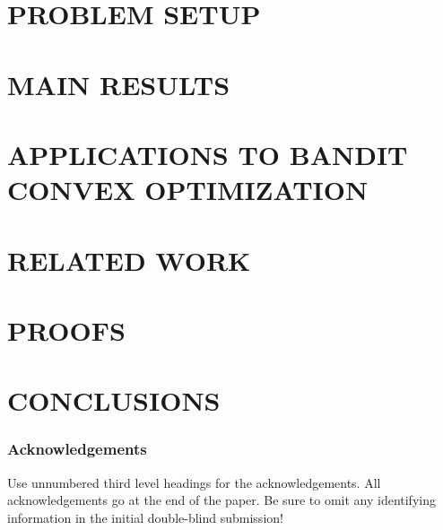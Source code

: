 \documentclass[twoside]{article}
\begin{document}
\section{PROBLEM SETUP}
\label{sec:problem}


\section{MAIN RESULTS}
\label{sec:results}


\section{APPLICATIONS TO BANDIT CONVEX OPTIMIZATION}
\label{sec:ex}


\section{RELATED WORK}
\label{sec:related}


\section{PROOFS}
\label{sec:proofs}
%

%

\section{CONCLUSIONS}
\label{sec:conc}



\clearpage\newpage



\subsubsection*{Acknowledgements}

Use unnumbered third level headings for the acknowledgements.  All
acknowledgements go at the end of the paper.  Be sure to omit any
identifying information in the initial double-blind submission!
\fi

\clearpage\newpage
\onecolumn
\appendix

\end{document}
